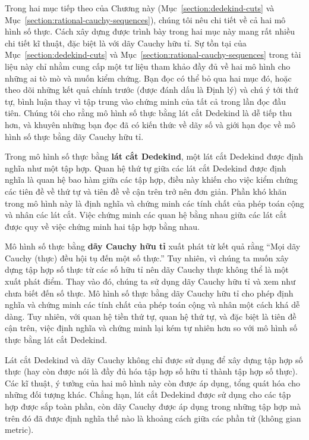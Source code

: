 Trong hai mục tiếp theo của Chương này (Mục~\ref{section:dedekind-cuts} và Mục~\ref{section:rational-cauchy-sequences}), chúng tôi nêu chi tiết về cả hai mô hình số thực. Cách xây dựng được trình bày trong hai mục này mang rất nhiều chi tiết kĩ thuật, đặc biệt là với dãy Cauchy hữu tỉ. Sự tồn tại của Mục~\ref{section:dedekind-cuts} và Mục~\ref{section:rational-cauchy-sequences} trong tài liệu này chỉ nhằm cung cấp một tư liệu tham khảo đầy đủ về hai mô hình cho những ai tò mò và muốn kiểm chứng. Bạn đọc có thể bỏ qua hai mục đó, hoặc theo dõi những kết quả chính trước (được đánh dấu là Định lý) và chú ý tới thứ tự, bình luận thay vì tập trung vào chứng minh của tất cả trong lần đọc đầu tiên. Chúng tôi cho rằng mô hình số thực bằng lát cắt Dedekind là dễ tiếp thu hơn, và khuyên những bạn đọc đã có kiến thức về dãy số và giới hạn đọc về mô hình số thực bằng dãy Cauchy hữu tỉ.

Trong mô hình số thực bằng \textbf{lát cắt Dedekind}, một lát cắt Dedekind được định nghĩa như một tập hợp. Quan hệ thứ tự giữa các lát cắt Dedekind được định nghĩa là quan hệ bao hàm giữa các tập hợp, điều này khiến cho việc kiểm chứng các tiên đề về thứ tự và tiên đề về cận trên trở nên đơn giản. Phần khó khăn trong mô hình này là định nghĩa và chứng minh các tính chất của phép toán cộng và nhân các lát cắt. Việc chứng minh các quan hệ bằng nhau giữa các lát cắt được quy về việc chứng minh hai tập hợp bằng nhau.

Mô hình số thực bằng \textbf{dãy Cauchy hữu tỉ} xuất phát từ kết quả rằng ``Mọi dãy Cauchy (thực) đều hội tụ đến một số thực.\@'' Tuy nhiên, vì chúng ta muốn xây dựng tập hợp số thực từ các số hữu tỉ nên dãy Cauchy thực không thể là một xuất phát điểm. Thay vào đó, chúng ta sử dụng dãy Cauchy hữu tỉ và xem như chưa biết đến số thực. Mô hình số thực bằng dãy Cauchy hữu tỉ cho phép định nghĩa và chứng minh các tính chất của phép toán cộng và nhân một cách khá dễ dàng. Tuy nhiên, với quan hệ tiền thứ tự, quan hệ thứ tự, và đặc biệt là tiên đề cận trên, việc định nghĩa và chứng minh lại kém tự nhiên hơn so với mô hình số thực bằng lát cắt Dedekind.

Lát cắt Dedekind và dãy Cauchy không chỉ được sử dụng để xây dựng tập hợp số thực (hay còn được nói là đầy đủ hóa tập hợp số hữu tỉ thành tập hợp số thực). Các kĩ thuật, ý tưởng của hai mô hình này còn được áp dụng, tổng quát hóa cho những đối tượng khác. Chẳng hạn, lát cắt Dedekind được sử dụng cho các tập hợp được sắp toàn phần, còn dãy Cauchy được áp dụng trong những tập hợp mà trên đó đã được định nghĩa thế nào là khoảng cách giữa các phần tử (không gian metric).


